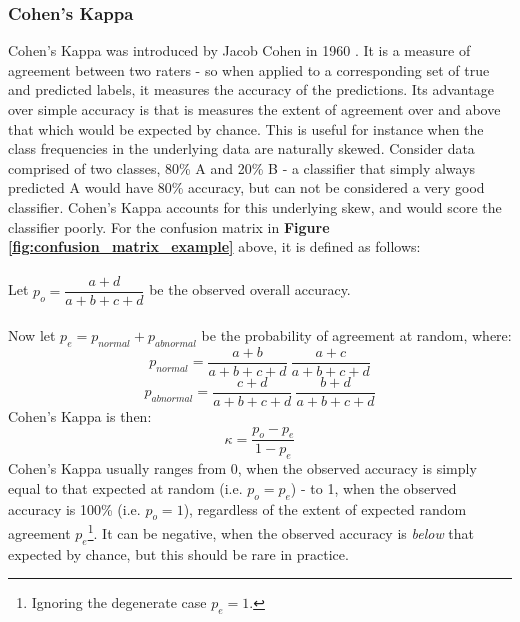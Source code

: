 \documentclass[11pt]{article} %
\theoremstyle{plain}
\theoremstyle{definition}
\begin{document}
\subsubsection{Cohen's Kappa}
Cohen's Kappa was introduced by Jacob Cohen in 1960 \cite{cohens_kappa}. It is a measure of agreement between two raters - so when applied to a corresponding set of true and predicted labels, it measures the accuracy of the predictions. Its advantage over simple accuracy is that is measures the extent of agreement over and above that which would be expected by chance. This is useful for instance when the class frequencies in the underlying data are naturally skewed. Consider data comprised of two classes, 80\% A and 20\% B - a classifier that simply always predicted A would have 80\% accuracy, but can not be considered a very good classifier. Cohen's Kappa accounts for this underlying skew, and would score the classifier poorly. For the confusion matrix in \textbf{Figure \ref{fig:confusion_matrix_example}} above, it is defined as follows:
\\
\\
\noindent
Let \(p_o = \dfrac{a+d}{a+b+c+d}\) be the observed overall accuracy.
\\
\\
\noindent
Now let \(p_e = p_{normal} + p_{abnormal}\) be the probability of agreement at random, where:
\[p_{normal} = \dfrac{a+b}{a+b+c+d} \ \dfrac{a+c}{a+b+c+d} \]
\[p_{abnormal} = \dfrac{c+d}{a+b+c+d} \ \dfrac{b+d}{a+b+c+d} \]
Cohen's Kappa is then:
\[ \kappa = \dfrac{p_o - p_e}{1-p_e} \]
Cohen's Kappa usually ranges from 0, when the observed accuracy is simply equal to that expected at random (i.e. \(p_o = p_e\)) - to 1, when the observed accuracy is 100\% (i.e. \(p_o=1\)), regardless of the extent of expected random agreement \(p_e\)\footnote{Ignoring the degenerate case \(p_e=1\).}. It can be negative, when the observed accuracy is \textit{below} that expected by chance, but this should be rare in practice.
\end{document}
